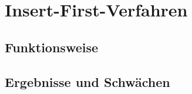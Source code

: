 \section{Insert-First-Verfahren}

\subsection{Funktionsweise}

\subsection{Ergebnisse und Schwächen}
